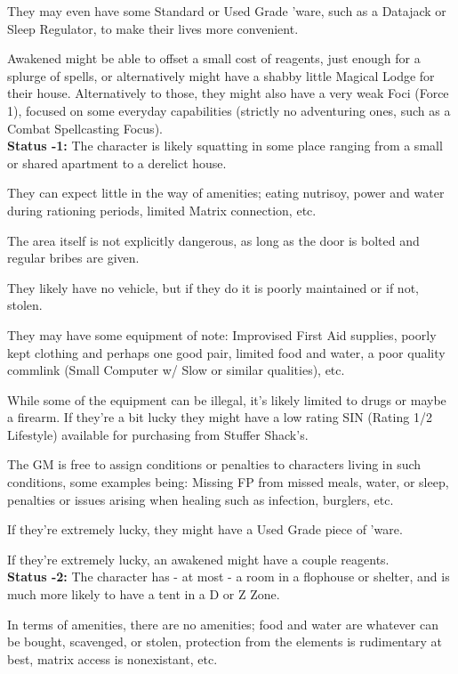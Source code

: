 \begin{multicols}{2}
\begin{coloredbox}
	They may even have some Standard or Used Grade 'ware, such as a Datajack or Sleep Regulator, to make their lives more convenient.
	
	Awakened might be able to offset a small cost of reagents, just enough for a splurge of spells, or alternatively might have a shabby little Magical Lodge for their house. Alternatively to those, they might also have a very weak Foci (Force 1), focused on some everyday capabilities (strictly no adventuring ones, such as a Combat Spellcasting Focus).\\
	
	\textbf{Status -1:} The character is likely squatting in some place ranging from a small or shared apartment to a derelict house. 
	
	They can expect little in the way of amenities; eating nutrisoy, power and water during rationing periods, limited Matrix connection, etc. 
	
	The area itself is not explicitly dangerous, as long as the door is bolted and regular bribes are given. 
	
	They likely have no vehicle, but if they do it is poorly maintained or if not, stolen. 
	
	They may have some equipment of note: Improvised First Aid supplies, poorly kept clothing and perhaps one good pair, limited food and water, a poor quality commlink (Small Computer w/ Slow or similar qualities), etc. 
	
	While some of the equipment can be illegal, it's likely limited to drugs or maybe a firearm. If they're a bit lucky they might have a low rating SIN (Rating 1/2 Lifestyle) available for purchasing from Stuffer Shack's.
	
	The GM is free to assign conditions or penalties to characters living in such conditions, some examples being: Missing FP from missed meals, water, or sleep, penalties or issues arising when healing such as infection, burglers, etc. 
	
	If they're extremely lucky, they might have a Used Grade piece of 'ware.
	
	If they're extremely lucky, an awakened might have a couple reagents.\\
	
	\textbf{Status -2:} The character has - at most - a room in a flophouse or shelter, and is much more likely to have a tent in a D or Z Zone. 
	
	In terms of amenities, there are no amenities; food and water are whatever can be bought, scavenged, or stolen, protection from the elements is rudimentary at best, matrix access is nonexistant, etc. 
	

\end{coloredbox}
\end{multicols}
